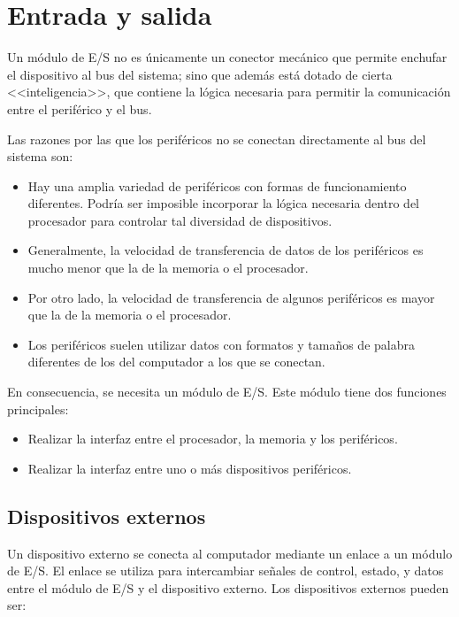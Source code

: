 \section{Entrada y salida}

Un módulo de E/S no es únicamente un conector mecánico que permite enchufar el dispositivo al bus del sistema; sino que además está dotado de cierta <<inteligencia>>, que contiene la lógica necesaria para permitir la comunicación entre el periférico y el bus.

Las razones por las que los periféricos no se conectan directamente al bus del sistema son:

\begin{itemize}
  \item Hay una amplia variedad de periféricos con formas de funcionamiento diferentes. Podría ser imposible incorporar la lógica necesaria dentro del procesador para controlar tal diversidad de dispositivos.
  \item Generalmente, la velocidad de transferencia de datos de los periféricos es mucho menor que la de la memoria o el procesador.
  \item Por otro lado, la velocidad de transferencia de algunos periféricos es mayor que la de la memoria o el procesador.
  \item Los periféricos suelen utilizar datos con formatos y tamaños de palabra diferentes de los del computador a los que se conectan.
\end{itemize}

En consecuencia, se necesita un módulo de E/S. Este módulo tiene dos funciones principales:

\begin{itemize}
  \item Realizar la interfaz entre el procesador, la memoria y los periféricos.
  \item Realizar la interfaz entre uno o más dispositivos periféricos.
\end{itemize}

\subsection{Dispositivos externos}

Un dispositivo externo se conecta al computador mediante un enlace a un módulo de E/S. El enlace se utiliza para intercambiar señales de control, estado, y datos entre el módulo de E/S y el dispositivo externo. Los dispositivos externos pueden ser:


